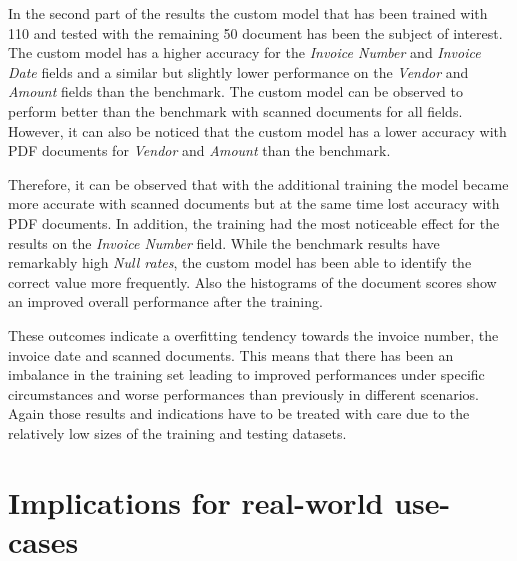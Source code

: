 In the second part of the results the custom model that has been trained with 110 and tested with the remaining 50 document has been the subject of interest.
The custom model has a higher accuracy for the \textit{Invoice Number} and \textit{Invoice Date} fields and a similar but slightly lower performance on the \textit{Vendor} and \textit{Amount} fields than the benchmark.
The custom model can be observed to perform better than the benchmark with scanned documents for all fields. However, it can also be noticed that the custom model has a lower accuracy with PDF documents for \textit{Vendor} and \textit{Amount} than the benchmark.

Therefore, it can be observed that with the additional training the model became more accurate with scanned documents but at the same time lost accuracy with PDF documents. 
In addition, the training had the most noticeable effect for the results on the \textit{Invoice Number} field. 
While the benchmark results have remarkably high \textit{Null rates}, the custom model has been able to identify the correct value more frequently.
Also the histograms of the document scores show an improved overall performance after the training.

These outcomes indicate a overfitting tendency towards the invoice number, the invoice date and scanned documents.
This means that there has been an imbalance in the training set leading to improved performances under specific circumstances and worse performances than previously in different scenarios.
Again those results and indications have to be treated with care due to the relatively low sizes of the training and testing datasets.

\section{Implications for real-world use-cases}

